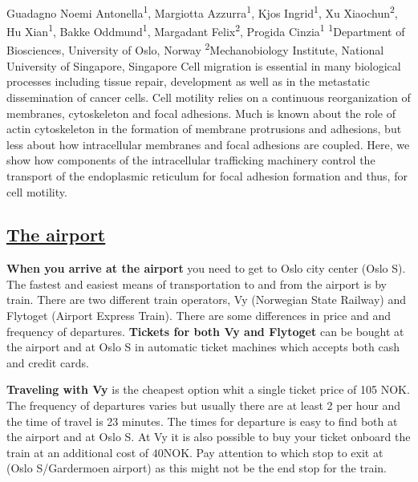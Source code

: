 \documentclass{article}
\begin{document}
{Guadagno Noemi Antonella\textsuperscript{1}, Margiotta Azzurra\textsuperscript{1},
    Kjos Ingrid\textsuperscript{1}, Xu Xiaochun\textsuperscript{2}, Hu Xian\textsuperscript{1},
    Bakke Oddmund\textsuperscript{1}, Margadant Felix\textsuperscript{2}, Progida Cinzia\textsuperscript{1}
}
{\textsuperscript{1}Department of Biosciences, University of Oslo, Norway\newline
\textsuperscript{2}Mechanobiology Institute, National University of Singapore, Singapore}
{Cell migration is essential in many biological processes including tissue repair,
development as well as in the metastatic dissemination of cancer cells. Cell motility
relies on a continuous reorganization of membranes, cytoskeleton and focal adhesions. Much
is known about the role of actin cytoskeleton in the formation of membrane protrusions and
adhesions, but less about how intracellular membranes and focal adhesions are coupled.
Here, we show how components of the intracellular trafficking machinery control the
transport of the endoplasmic reticulum for focal adhesion formation and thus, for cell
motility.}

\clearpage

\subsection*{\underline{The airport}}

\textbf{When you arrive at the airport} you need to
get to Oslo city center (Oslo S).
The fastest and easiest means of transportation to and from the airport
is by train. There are two different train operators, Vy
(Norwegian State Railway) and Flytoget (Airport Express Train).
There are some differences in price and and frequency of departures.
\textbf{Tickets for both Vy and Flytoget} can be bought at the airport
and at Oslo S in automatic ticket machines which accepts both cash
and credit cards.

\textbf{Traveling with Vy} is the cheapest
option whit a single ticket price of 105 NOK. The frequency of departures varies but
usually there are at least 2 per hour and the time of travel is 23 minutes. The times for
departure is easy to find both at the airport and at Oslo S. At Vy it is also possible to
buy your ticket onboard the train at an additional cost of $40$NOK.
Pay attention to which stop to exit at (Oslo S/Gardermoen airport)
as this might not be the end stop for the train.
\end{document}
